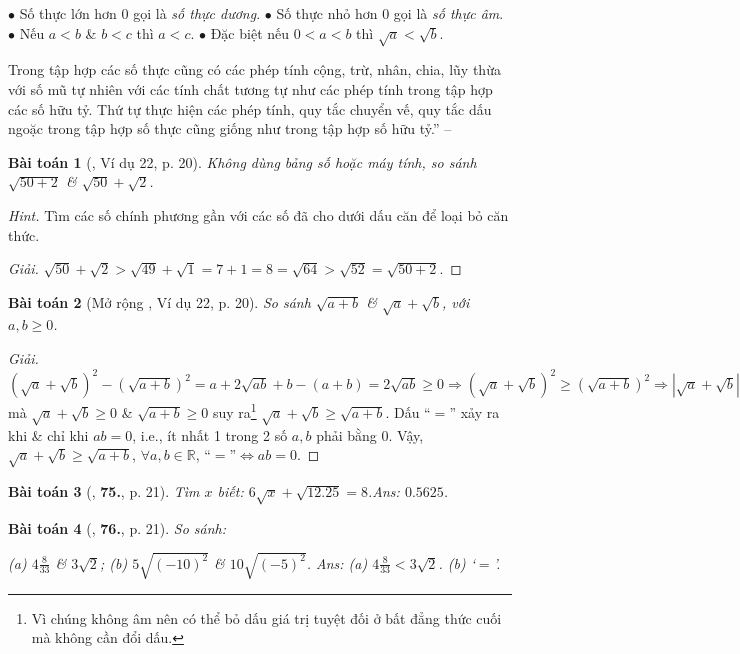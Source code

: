\documentclass{article}
\newtheorem{baitoan}{Bài toán}
\begin{document}
		$\bullet$ Số thực lớn hơn $0$ gọi là \textit{số thực dương}.
		$\bullet$ Số thực nhỏ hơn $0$ gọi là \textit{số thực âm}.
		$\bullet$ Nếu $a < b$ \& $b < c$ thì $a < c$.
		$\bullet$ Đặc biệt nếu $0 < a < b$ thì $\sqrt{a} < \sqrt{b}$.
	
	 Trong tập hợp các số thực cũng có các phép tính cộng, trừ, nhân, chia, lũy thừa với số mũ tự nhiên với các tính chất tương tự như các phép tính trong tập hợp các số hữu tỷ. Thứ tự thực hiện các phép tính, quy tắc chuyển vế, quy tắc dấu ngoặc trong tập hợp số thực cũng giống như trong tập hợp số hữu tỷ.'' -- \cite[Chap. 2, \S2, p. 20]{Tuyen_Toan_7}


\begin{baitoan}[\cite{Tuyen_Toan_7}, Ví dụ 22, p. 20]
	Không dùng bảng số hoặc máy tính, so sánh $\sqrt{50 + 2}$ \& $\sqrt{50} + \sqrt{2}$.
\end{baitoan}
\noindent\textit{Hint.} Tìm các số chính phương gần với các số đã cho dưới dấu căn để loại bỏ căn thức.

\begin{proof}[Giải]
	$\sqrt{50} + \sqrt{2} > \sqrt{49} + \sqrt{1} = 7 + 1 = 8 = \sqrt{64} > \sqrt{52} = \sqrt{50 + 2}$.
\end{proof}

\begin{baitoan}[Mở rộng \cite{Tuyen_Toan_7}, Ví dụ 22, p. 20]
	So sánh $\sqrt{a + b}$ \& $\sqrt{a} + \sqrt{b}$, với $a,b\ge 0$.
\end{baitoan}

\begin{proof}[Giải]
	$(\sqrt{a} + \sqrt{b})^2 - (\sqrt{a + b})^2 = a + 2\sqrt{ab} + b - (a + b) = 2\sqrt{ab}\ge 0\Rightarrow(\sqrt{a} + \sqrt{b})^2\ge(\sqrt{a + b})^2\Rightarrow|\sqrt{a} + \sqrt{b}|\ge|\sqrt{a + b}|$ mà $\sqrt{a} + \sqrt{b}\ge 0$ \& $\sqrt{a + b}\ge 0$ suy ra\footnote{Vì chúng không âm nên có thể bỏ dấu giá trị tuyệt đối ở bất đẳng thức cuối mà không cần đổi dấu.} $\sqrt{a} + \sqrt{b}\ge\sqrt{a + b}$. Dấu ``$=$'' xảy ra khi \& chỉ khi $ab = 0$, i.e., ít nhất 1 trong 2 số $a,b$ phải bằng $0$. Vậy, $\sqrt{a} + \sqrt{b}\ge\sqrt{a + b}$, $\forall a,b\in\mathbb{R}$, ``$=$''$\Leftrightarrow ab = 0$.
\end{proof}

\begin{baitoan}[\cite{Tuyen_Toan_7}, \textbf{75.}, p. 21]
	Tìm $x$ biết: $6\sqrt{x} + \sqrt{12.25} = 8$.\hfill{\sf Ans:} $0.5625$.
\end{baitoan}

\begin{baitoan}[\cite{Tuyen_Toan_7}, \textbf{76.}, p. 21]
	So sánh:
	
		(a) $4\frac{8}{33}$ \& $3\sqrt{2}$;
		(b) $5\sqrt{(-10)^2}$ \& $10\sqrt{(-5)^2}$.
	\hfill{\sf Ans:} (a) $4\frac{8}{33} < 3\sqrt{2}$. (b) `$=$'.
\end{baitoan}
\end{document}
